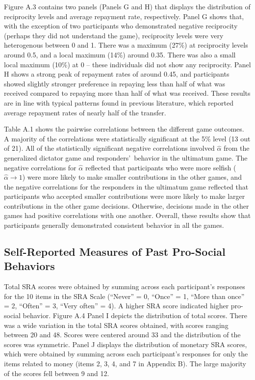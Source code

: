 \documentclass[12pt]{article}
\begin{document}
Figure A.3 contains two panels (Panels G and H) that displays the distribution of reciprocity levels and average repayment rate, respectively. Panel G shows that, with the exception of two participants who demonstrated negative reciprocity (perhaps they did not understand the game), reciprocity levels were very heterogenous between 0 and 1. There was a maximum (27\%) at reciprocity levels around 0.5, and a local maximum (14\%) around 0.35. There was also a small local maximum (10\%) at 0 -- these individuals did not show any reciprocity. Panel H shows a strong peak of repayment rates of around 0.45, and participants showed slightly stronger preference in repaying less than half of what was received compared to repaying more than half of what was received. These results are in line with typical patterns found in previous literature, which reported average repayment rates of nearly half of the transfer.

Table A.1 shows the pairwise correlations between the different game outcomes. A majority of the correlations were statistically significant at the 5\% level (13 out of 21). All of the statistically significant negative correlations involved \(\hat{\alpha}\) from the generalized dictator game and responders\rq \ behavior in the ultimatum game. The negative correlations for \(\hat{\alpha}\) reflected that participants who were more selfish (\(\hat{\alpha} \rightarrow 1\)) were more likely to make smaller contributions in the other games, and the negative correlations for the responders in the ultimatum game reflected that participants who accepted smaller contributions were more likely to make larger contributions in the other game decisions. Otherwise, decisions made in the other games had positive correlations with one another. Overall, these results show that participants generally demonstrated consistent behavior in all the games.

\subsection{Self-Reported Measures of Past Pro-Social Behaviors}

Total SRA scores were obtained by summing across each participant\rq s responses for the 10 items in the SRA Scale (``Never'' = 0, ``Once'' = 1, ``More than once'' = 2, ``Often'' = 3, ``Very often'' = 4). A higher SRA score indicated higher pro-social behavior. Figure A.4 Panel I depicts the distribution of total scores. There was a wide variation in the total SRA scores obtained, with scores ranging between 20 and 48. Scores were centered around 33 and the distribution of the scores was symmetric. Panel J displays the distribution of monetary SRA scores, which were obtained by summing across each participant\rq s responses for only the items related to money (items 2, 3, 4, and 7 in Appendix B).  The large majority of the scores fell between 9 and 12.
\end{document}
